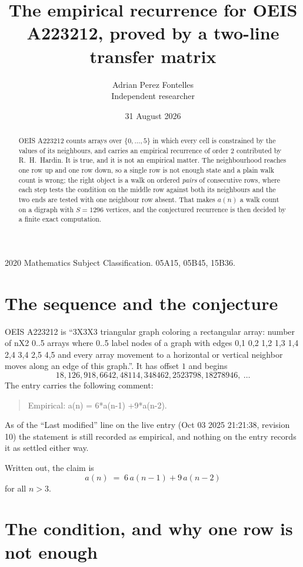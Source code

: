 \documentclass[11pt,a4paper]{article}
\title{The empirical recurrence for OEIS A223212, proved by a two-line transfer matrix}
\author{Adrian Perez Fontelles\\ \small Independent researcher}
\date{31 August 2026}
\theoremstyle{plain}
\theoremstyle{definition}
\begin{document}
\maketitle

\begin{abstract}
OEIS A223212 counts arrays over $\{0,\dots,5\}$ in which every cell is constrained by the
values of its neighbours, and carries an empirical recurrence of order $2$ contributed
by R.~H.~Hardin. It is true, and it is not an empirical matter. The neighbourhood reaches one
row up and one row down, so a single row is not enough state and a plain walk count
is wrong; the right object is a walk on ordered \emph{pairs} of consecutive rows, where
each step tests the condition on the middle row against both its neighbours and the two
ends are tested with one neighbour row absent. That makes $a(n)$ a walk count on a digraph
with $S=1296$ vertices, and the conjectured recurrence is then decided by a finite exact
computation.
\end{abstract}

\noindent\small 2020 Mathematics Subject Classification. 05A15, 05B45, 15B36.\normalsize

\section{The sequence and the conjecture}

OEIS A223212 is ``3X3X3 triangular graph coloring a rectangular array: number of nX2 0..5 arrays where 0..5 label nodes of a graph with edges 0,1 0,2 1,2 1,3 1,4 2,4 3,4 2,5 4,5 and every array movement to a horizontal or vertical neighbor moves along an edge of this graph.''. It has offset $1$ and begins
\[
18, 126, 918, 6642, 48114, 348462, 2523798, 18278946,\ \dots
\]
The entry carries the following comment:
\begin{quote}\small
Empirical: a(n) = 6*a(n-1) +9*a(n-2).
\end{quote}
As of the ``Last modified'' line on the live entry (Oct 03 2025 21:21:38, revision 10) the statement is
still recorded as empirical, and nothing on the entry records it as settled either way.

Written out, the claim is
\begin{equation}\label{eq:conj}
a(n)\;=\;6\,a(n-1) + 9\,a(n-2)
\end{equation}
for all $n>3$.

\section{The condition, and why one row is not enough}
\end{document}
